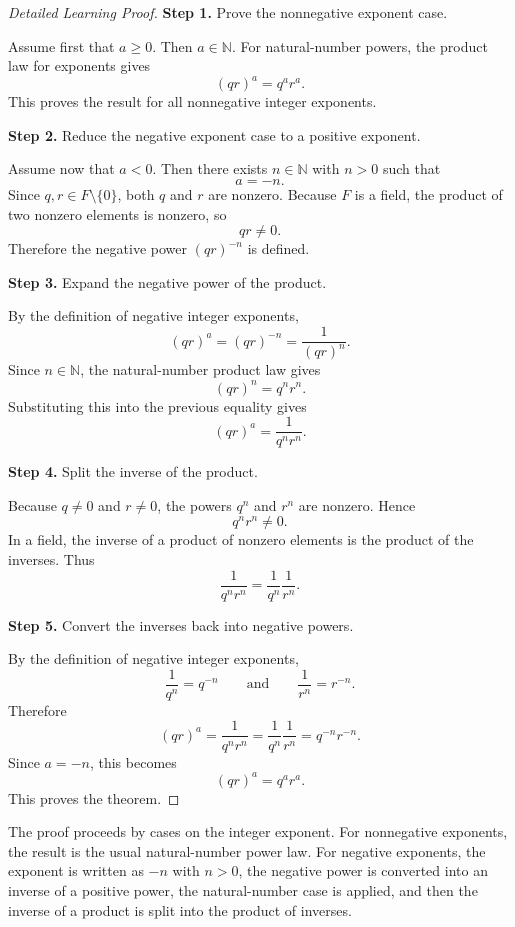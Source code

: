 \begin{proof}[Detailed Learning Proof]
\LRAProofBodyStart

\textbf{Step 1.} Prove the nonnegative exponent case.

Assume first that $a\ge 0$. Then $a\in\mathbb{N}$. For natural-number
powers, the product law for exponents gives
\[
(qr)^a=q^a r^a.
\]
This proves the result for all nonnegative integer exponents.

\textbf{Step 2.} Reduce the negative exponent case to a positive exponent.

Assume now that $a<0$. Then there exists $n\in\mathbb{N}$ with
$n>0$ such that
\[
a=-n.
\]
Since $q,r\in F\setminus\{0\}$, both $q$ and $r$ are nonzero. Because
$F$ is a field, the product of two nonzero elements is nonzero, so
\[
qr\neq 0.
\]
Therefore the negative power $(qr)^{-n}$ is defined.

\textbf{Step 3.} Expand the negative power of the product.

By the definition of negative integer exponents,
\[
(qr)^a=(qr)^{-n}=\frac{1}{(qr)^n}.
\]
Since $n\in\mathbb{N}$, the natural-number product law gives
\[
(qr)^n=q^n r^n.
\]
Substituting this into the previous equality gives
\[
(qr)^a=\frac{1}{q^n r^n}.
\]

\textbf{Step 4.} Split the inverse of the product.

Because $q\neq 0$ and $r\neq 0$, the powers $q^n$ and $r^n$ are
nonzero. Hence
\[
q^n r^n\neq 0.
\]
In a field, the inverse of a product of nonzero elements is the product
of the inverses. Thus
\[
\frac{1}{q^n r^n}=\frac{1}{q^n}\frac{1}{r^n}.
\]

\textbf{Step 5.} Convert the inverses back into negative powers.

By the definition of negative integer exponents,
\[
\frac{1}{q^n}=q^{-n}
\qquad\text{and}\qquad
\frac{1}{r^n}=r^{-n}.
\]
Therefore
\[
(qr)^a
=
\frac{1}{q^n r^n}
=
\frac{1}{q^n}\frac{1}{r^n}
=
q^{-n}r^{-n}.
\]
Since $a=-n$, this becomes
\[
(qr)^a=q^a r^a.
\]
This proves the theorem.
\end{proof}

\begin{remark*}
The proof proceeds by cases on the integer exponent. For nonnegative
exponents, the result is the usual natural-number power law. For negative
exponents, the exponent is written as $-n$ with $n>0$, the negative
power is converted into an inverse of a positive power, the natural-number
case is applied, and then the inverse of a product is split into the product
of inverses.
\end{remark*}

